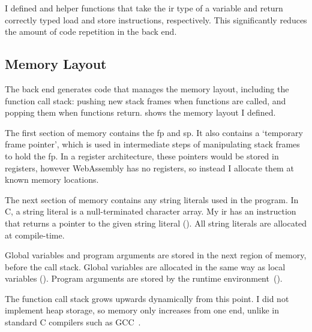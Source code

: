 \documentclass[00-main.tex]{subfiles}
\begin{document}
I defined  and  helper functions that take the \gls{ir} type of a variable and return correctly typed load and store instructions, respectively.
This significantly reduces the amount of code repetition in the back end.


\vspace{-6pt}
\subsection{Memory Layout}

The back end generates code that manages the memory layout, including the function call stack: pushing new stack frames when functions are called, and popping them when functions return.
 shows the memory layout I defined.


The first section of memory contains the \gls{fp} and \gls{sp}.
It also contains a `temporary frame pointer', which is used in intermediate steps of manipulating stack frames to hold the \gls{fp}.
In a register architecture, these pointers would be stored in registers, however WebAssembly has no registers, so instead I allocate them at known memory locations.

The next section of memory contains any string literals used in the program.
In C, a string literal is a null-terminated character array.
My \gls{ir} has an instruction that returns a pointer to the given string literal ().
All string literals are allocated at compile-time.

Global variables and program arguments are stored in the next region of memory, before the call stack.
Global variables are allocated in the same way as local variables ().
Program arguments are stored by the runtime environment~().

The function call stack grows upwards dynamically from this point.
I did not implement heap storage, so memory only increases from one end, unlike in standard C compilers such as GCC~.
\end{document}
